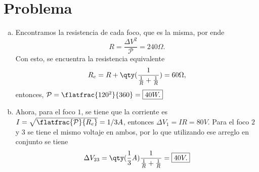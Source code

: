 \section*{Problema}

\begin{enumerate}[a)]
	\item Encontramos la resistencia de cada foco, que es la misma, por ende
			$$ R = \frac{\Delta V ^2}{\mathcal{P}} = 240 \Omega . $$
		Con esto, se encuentra la resistencia equivalente
			$$ R_e = R + \qty(\frac{1}{\frac{1}{R} + \frac{1}{R}}) = 60\Omega , $$
		entonces, $\mathcal{P} = \flatfrac{120^2}{360} = \boxed{40W.}$
	\item Ahora, para el foco $1$, se tiene que la corriente es $I = \sqrt{\flatfrac{\mathcal{P}}{R_e}} = 1/3 A$, entonces $\Delta V_1 = I R = \boxed{80V}$. Para el foco $2$ y $3$ se tiene el mismo voltaje en ambos, por lo que utilizando ese arreglo en conjunto se tiene
		$$ \Delta V_{23} = \qty(\frac{1}{3} A) \frac{1}{\frac{1}{R} + \frac{1}{R}} = \boxed{40V.} $$
\end{enumerate}






